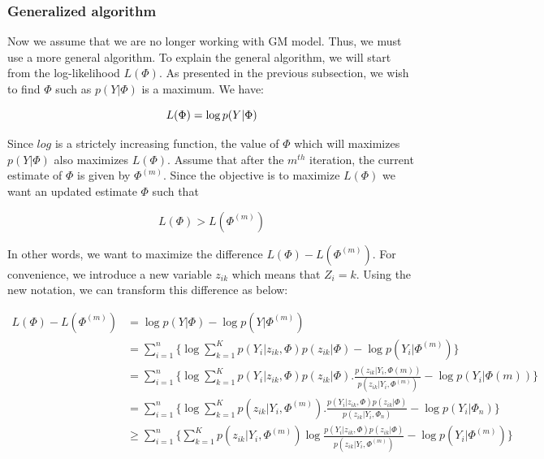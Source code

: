 \subsubsection{Generalized algorithm}\label{GENERAL}
Now we assume that we are no longer working with GM model. Thus, we must use a more general algorithm. %
To explain the general algorithm, we will start from the log-likelihood $L(\Phi)$. As presented in the previous subsection, we wish to find $\Phi$ such as $p(Y|\Phi)$ is a maximum. We have:

  \begin{equation*}
  L(\Phi)=\operatorname*{log} p(Y|\Phi)\\
  \end{equation*}
 
Since $log$ is a strictely increasing function, the value of $\Phi$ which will maximizes  $p(Y|\Phi)$ also maximizes $L(\Phi)$. Assume that after the $m^{th}$ iteration, the current estimate of $\Phi$ is given by $\Phi^{(m)}$. Since the objective is to maximize $L(\Phi)$ we want an updated estimate $\Phi$ such that

  \begin{equation*}
  L(\Phi)>L(\Phi^{(m)})
  \end{equation*}
 
In other words, we want to maximize the difference $L(\Phi)-L(\Phi^{(m)})$. For convenience, we introduce a new variable $z_{ik}$ which means that $Z_i=k$. Using the new notation, we can transform this difference as below:

 
  \begin{align*}
  L(\Phi)-L(\Phi^{(m)}) &=\operatorname*{log} p(Y|\Phi) -\operatorname*{log} p(Y|\Phi^{(m)})\\
                    &=\sum_{i=1}^n\{\operatorname*{log} \sum_{k=1}^K p(Y_i|z_{ik},\Phi)p(z_{ik}|\Phi)-\operatorname*{log} p(Y_i|\Phi^{(m)})\}\\
                    &=\sum_{i=1}^n\{\operatorname*{log} \sum_{k=1}^K p(Y_i|z_{ik},\Phi)p(z_{ik}|\Phi).\frac{p(z_{ik}|Y_i,\Phi{(m)})}{p(z_{ik}|Y_i,\Phi^{(m)})}-\operatorname*{log} p(Y_i|\Phi{(m)})\}\\
                    &=\sum_{i=1}^n\{\operatorname*{log} \sum_{k=1}^K p(z_{ik}|Y_i,\Phi^{(m)}).\frac{p(Y_i|z_{ik},\Phi)p(z_{ik}|\Phi)}{p(z_{ik}|Y_i,\Phi_n)}-\operatorname*{log} p(Y_i|\Phi_n)\}\\
                    &\geq \sum_{i=1}^n\{\sum_{k=1}^K p(z_{ik}|Y_i,\Phi^{(m)})\operatorname*{log} \frac{p(Y_i|z_{ik},\Phi)p(z_{ik}|\Phi)}{p(z_{ik}|Y_i,\Phi^{(m)})}-\operatorname*{log} p(Y_i|\Phi^{(m)})\}
  \end{align*}


